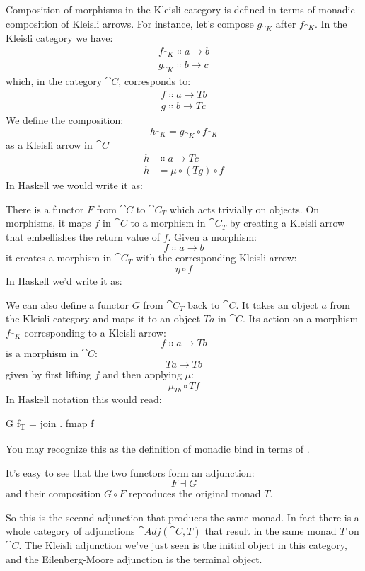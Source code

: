 Composition of morphisms in the Kleisli category is defined in terms of
monadic composition of Kleisli arrows. For instance, let's compose
$g_{\cat{K}}$ after $f_{\cat{K}}$. In the Kleisli category we have:
\begin{gather*}
  f_{\cat{K}} \Colon a \to b \\
  g_{\cat{K}} \Colon b \to c
\end{gather*}
which, in the category $\cat{C}$, corresponds to:
\begin{gather*}
  f \Colon a \to T b \\
  g \Colon b \to T c
\end{gather*}
We define the composition:
\[h_{\cat{K}} = g_{\cat{K}} \circ f_{\cat{K}}\]
as a Kleisli arrow in $\cat{C}$
\begin{align*}
  h & \Colon a \to T c          \\
  h & = \mu \circ (T g) \circ f
\end{align*}
In Haskell we would write it as:

There is a functor $F$ from $\cat{C}$ to $\cat{C}_T$
which acts trivially on objects. On morphisms, it maps $f$ in
$\cat{C}$ to a morphism in $\cat{C}_T$ by creating a
Kleisli arrow that embellishes the return value of $f$. Given a
morphism:
\[f \Colon a \to b\]
it creates a morphism in $\cat{C}_T$ with the
corresponding Kleisli arrow:
\[\eta \circ f\]
In Haskell we'd write it as:

We can also define a functor $G$ from $\cat{C}_T$
back to $\cat{C}$. It takes an object $a$ from the Kleisli
category and maps it to an object $T a$ in $\cat{C}$. Its action
on a morphism $f_{\cat{K}}$ corresponding to a Kleisli arrow:
\[f \Colon a \to T b\]
is a morphism in $\cat{C}$:
\[T a \to T b\]
given by first lifting $f$ and then applying $\mu$:
\[\mu_{T b} \circ T f\]
In Haskell notation this would read:

\begin{snipv}
G f\textsubscript{T} = join . fmap f
\end{snipv}
You may recognize this as the definition of monadic bind in terms of
.

It's easy to see that the two functors form an adjunction:
\[F \dashv G\]
and their composition $G \circ F$ reproduces the original monad $T$.

So this is the second adjunction that produces the same monad. In fact
there is a whole category of adjunctions $\cat{Adj}(\cat{C}, T)$ that result
in the same monad $T$ on $\cat{C}$. The Kleisli adjunction we've
just seen is the initial object in this category, and the
Eilenberg-Moore adjunction is the terminal object.

